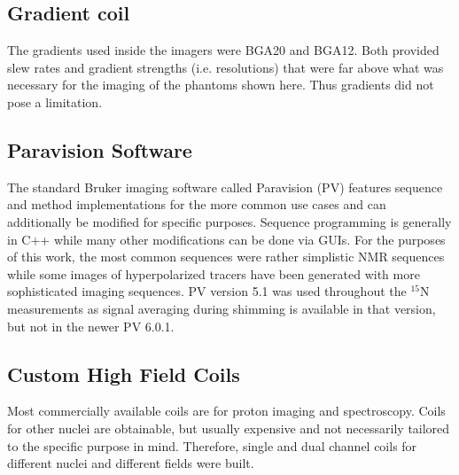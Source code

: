         \subsection{Gradient coil}
            The gradients used inside the imagers were BGA20 and BGA12. Both provided slew rates and gradient strengths (i.e. resolutions) that were far above what was necessary for the imaging of the phantoms shown here. Thus gradients did not pose a limitation.
        \subsection{Paravision Software}
        The standard Bruker imaging software called Paravision (PV) features sequence and method implementations for the more common use cases and can additionally be modified for specific purposes. Sequence programming is generally in C++ while many other modifications can be done via GUIs.  For the purposes of this work, the most common sequences were rather simplistic NMR sequences while some images of hyperpolarized tracers have been generated with more sophisticated imaging sequences. PV version 5.1 was used throughout the $^{15}$N measurements as signal averaging during shimming is available in that version, but not in the newer PV 6.0.1.
        \subsection{Custom High Field Coils}
            Most commercially available coils are for proton imaging and spectroscopy. Coils for other nuclei are obtainable, but usually expensive and not necessarily tailored to the specific purpose in mind. Therefore, single and dual channel coils for different nuclei and different fields were built.
